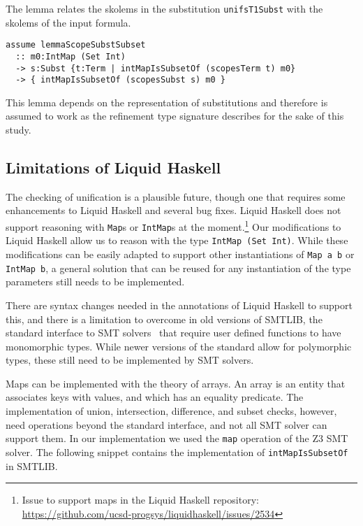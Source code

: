 \documentclass[sigconf, anonymous, review]{acmart}
\newcommand{\tc}[1]{{\small\texttt{#1}}}
\begin{document}
The lemma relates the skolems in the substitution \tc{unifsT1Subst}
with the skolems of the input formula.

\begin{verbatim}
assume lemmaScopeSubstSubset
  :: m0:IntMap (Set Int)
  -> s:Subst {t:Term | intMapIsSubsetOf (scopesTerm t) m0}
  -> { intMapIsSubsetOf (scopesSubst s) m0 }
\end{verbatim}

This lemma depends on the representation of substitutions and therefore is
assumed to work as the refinement type signature describes for the sake of
this study.


\subsection{Limitations of Liquid Haskell}
\label{limitations-of-liquid-haskell}

The checking of unification is a plausible future, though one that requires
some enhancements to Liquid Haskell and several bug fixes. Liquid Haskell does
not support reasoning with \tc{Map}s or \tc{IntMap}s at the
moment.\footnote{Issue to support maps in the Liquid Haskell repository: \url{https://github.com/ucsd-progsys/liquidhaskell/issues/2534}} Our
modifications to Liquid Haskell allow us to reason with the type
\tc{IntMap (Set Int)}. While these modifications can be easily adapted to
support other instantiations of \tc{Map a b} or \tc{IntMap b}, a general
solution that can be reused for any instantiation of the type parameters still
needs to be implemented.

There are syntax changes needed in the annotations of Liquid Haskell to support
this, and there is a limitation to overcome in old versions of SMTLIB, the standard
interface to SMT solvers~\cite{BarFT-RR-25} that require user defined functions to
have monomorphic types. While newer versions of the standard allow for polymorphic
types, these still need to be implemented by SMT solvers.

Maps can be implemented with the theory of arrays. An array is an entity that
associates keys with values, and which has an equality predicate.
The implementation of union, intersection, difference, and subset checks, however,
need operations beyond the standard interface, and not all SMT solver can support
them. In our implementation we used the \tc{map} operation of the
Z3 SMT solver. The following snippet contains the implementation of
\tc{intMapIsSubsetOf} in SMTLIB.
\end{document}
